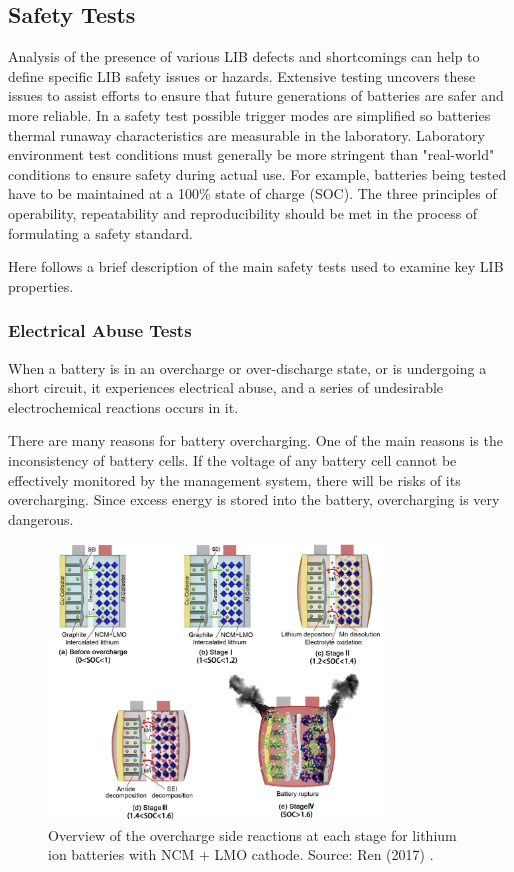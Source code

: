 \subsection{Safety Tests}
\label{sec:safety-tests}
Analysis of the presence of various LIB defects and shortcomings can help to define specific LIB safety issues or hazards. Extensive testing uncovers these issues to assist efforts to ensure that future generations of batteries are safer and more reliable. In a safety test possible trigger modes are simplified so batteries thermal runaway characteristics are measurable in the laboratory. Laboratory environment test conditions must generally be more stringent than "real-world" conditions to ensure safety during actual use. For example, batteries being tested have to be maintained at a 100\% state of charge (SOC). The three principles of operability, repeatability and reproducibility should be met in the process of formulating a safety standard. 

Here follows a brief description of the main safety tests used to examine key LIB properties.

\subsubsection{Electrical Abuse Tests}
\label{sec:electrical-abuse-tests}
When a battery is in an overcharge or over-discharge state, or is undergoing a short circuit, it experiences electrical abuse, and a series of undesirable electrochemical reactions occurs in it.

There are many reasons for battery overcharging. One of the main reasons is the inconsistency of battery cells. If the voltage of any battery cell cannot be effectively monitored by the management system, there will be risks of its overcharging. Since excess energy is stored into the battery, overcharging is very dangerous.

\begin{figure}[ht]
    \centering
    \includegraphics[width=0.8\textwidth]{Images/Chapter2/overcharge-failure.png}
    \caption[Overview of the overcharge side reactions]{Overview of the overcharge side reactions at each stage for lithium ion batteries with NCM + LMO cathode. Source: Ren (2017) \cite{ren2017electrochemical}.}
    \label{fig:overcharge-failure}
\end{figure}

